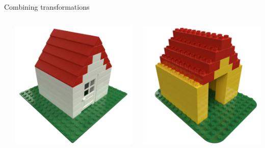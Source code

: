 \begin{frame}{Combining transformations}
\begin{columns}[c]
    \begin{column}{0.05\textwidth}
    \end{column}\begin{column}{0.3\textwidth}
        \includegraphics[width=\textwidth]{images/02_modelling_languages/lego_house.png}
    \end{column}\begin{column}{0.45\textwidth}
        \centering
        \includegraphics[width=\textwidth]{images/03_transformation_framework/duplo_house.png}
    \end{column}
\end{columns}
\end{frame}

